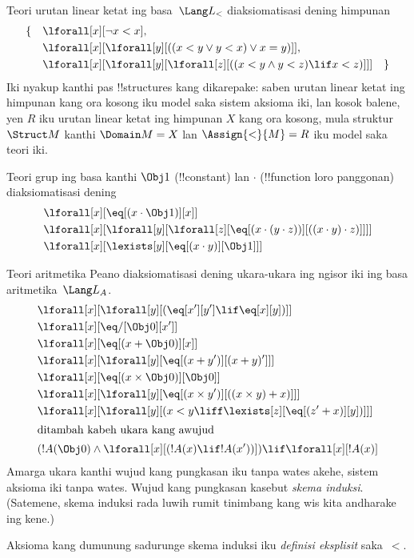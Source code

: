 \documentclass[../../../include/open-logic-section]{subfiles}
\begin{document}


\begin{ex}
Teori urutan linear ketat ing basa~$\Lang L_<$ diaksiomatisasi
dening himpunan
\begin{align*}
\{\quad & \lforall[x][\lnot x < x], \\
& \lforall[x][\lforall[y][((x < y \lor y <
    x) \lor x = y)]], \\
& \lforall[x][\lforall[y][\lforall[z][((x < y
      \land y < z) \lif x < z)]]] \quad \}
\end{align*}
Iki nyakup kanthi pas !!{structure}s kang dikarepake:
saben urutan linear ketat ing himpunan kang ora kosong iku model saka sistem aksioma iki,
lan kosok balene, yen $R$ iku urutan linear ketat ing himpunan $X$ kang ora kosong,
mula struktur $\Struct M$ kanthi $\Domain M = X$ lan
$\Assign{<}{M} = R$ iku model saka teori iki.
\end{ex}

\begin{ex}
Teori grup ing basa kanthi $\Obj 1$ (!!{constant}) lan $\cdot$
(!!{function} loro panggonan) diaksiomatisasi dening
\begin{align*}
& \lforall[x][\eq[(x \cdot \Obj 1)][x]]\\
& \lforall[x][\lforall[y][\lforall[z][\eq[(x \cdot (y \cdot z))][((x
          \cdot y) \cdot z)]]]]\\
& \lforall[x][\lexists[y][\eq[(x \cdot y)][\Obj 1]]]
\end{align*}
\end{ex}

\begin{ex}
Teori aritmetika Peano diaksiomatisasi dening
ukara-ukara ing ngisor iki ing basa aritmetika~$\Lang L_A$.
\begin{align*}
& \lforall[x][\lforall[y][(\eq[x'][y'] \lif \eq[x][y])]]\\
& \lforall[x][\eq/[\Obj 0][x']]\\
& \lforall[x][\eq[(x + \Obj 0)][x]]\\
& \lforall[x][\lforall[y][\eq[(x + y')][(x + y)']]]\\
& \lforall[x][\eq[(x \times \Obj 0)][\Obj 0]]\\
& \lforall[x][\lforall[y][\eq[(x \times y')][((x \times y) + x)]]]\\
& \lforall[x][\lforall[y][(x < y \liff \lexists[z][\eq[(z' + x)][y])]]]\\
\intertext{ditambah kabeh ukara kang awujud}
& (!A(\Obj 0) \land \lforall[x][(!A(x) \lif !A(x'))]) \lif \lforall[x][!A(x)]
\end{align*}
Amarga ukara kanthi wujud kang pungkasan iku tanpa wates akehe,
sistem aksioma iki tanpa wates. Wujud kang pungkasan kasebut
\emph{skema induksi}. (Satemene, skema induksi rada luwih
rumit tinimbang kang wis kita andharake ing kene.)

Aksioma kang dumunung sadurunge skema induksi iku
\emph{definisi eksplisit} saka~$<$.
\end{ex}
\end{document}
